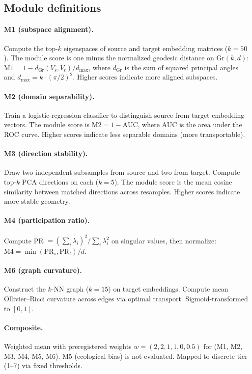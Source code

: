 \documentclass[10pt,letterpaper]{article}
\newcommand{\Gr}{\mathrm{Gr}}
\begin{document}
\subsection{Module definitions}

\paragraph{M1 (subspace alignment).} Compute the top-$k$ eigenspaces of source and target embedding matrices ($k = 50$). The module score is one minus the normalized geodesic distance on $\Gr(k, d)$: $\text{M1} = 1 - d_{\Gr}(V_s, V_t) / d_{\max}$, where $d_{\Gr}$ is the sum of squared principal angles and $d_{\max} = k \cdot (\pi/2)^2$. Higher scores indicate more aligned subspaces.

\paragraph{M2 (domain separability).} Train a logistic-regression classifier to distinguish source from target embedding vectors. The module score is $\text{M2} = 1 - \text{AUC}$, where AUC is the area under the ROC curve. Higher scores indicate less separable domains (more transportable).

\paragraph{M3 (direction stability).} Draw two independent subsamples from source and two from target. Compute top-$k$ PCA directions on each ($k = 5$). The module score is the mean cosine similarity between matched directions across resamples. Higher scores indicate more stable geometry.

\paragraph{M4 (participation ratio).} Compute PR $= (\sum_i \lambda_i)^2 / \sum_i \lambda_i^2$ on singular values, then normalize: $\text{M4} = \min(\text{PR}_s, \text{PR}_t) / d$.

\paragraph{M6 (graph curvature).} Construct the $k$-NN graph ($k = 15$) on target embeddings. Compute mean Ollivier--Ricci curvature across edges via optimal transport. Sigmoid-transformed to $[0, 1]$.

\paragraph{Composite.} Weighted mean with preregistered weights $w = (2, 2, 1, 1, 0, 0.5)$ for (M1, M2, M3, M4, M5, M6). M5 (ecological bias) is not evaluated. Mapped to discrete tier (1--7) via fixed thresholds.
\end{document}
